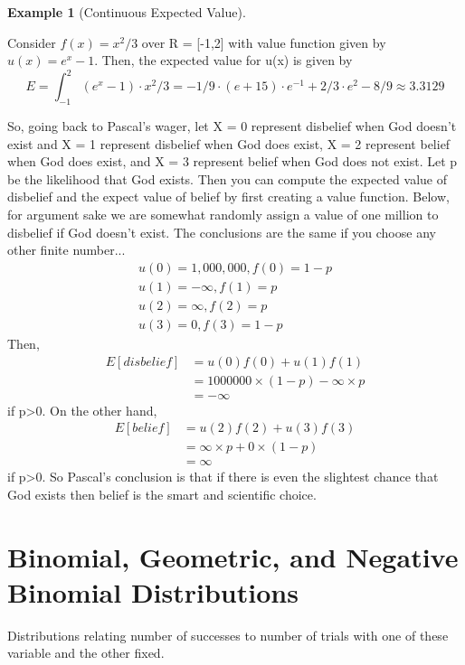 \documentclass[10pt,]{book}
\theoremstyle{plain}
\theoremstyle{definition}
\theoremstyle{definition}
\newtheorem{example}[theorem]{Example}
\numberwithin{equation}{section}
\begin{document}
\begin{example}[Continuous Expected Value]\label{example-22}

	Consider \(f(x) = x^2/3\) over R = [-1,2] with value function given by \(u(x) = e^x - 1\). Then, the expected value for u(x) is given by
	\begin{equation*}E = \int_{-1}^2 (e^x-1) \cdot x^2/3 = -1/9 \cdot (e + 15) \cdot e^{-1} + 2/3 \cdot e^2 - 8/9 \approx 3.3129\end{equation*}
\end{example}
\par
So, going back to Pascal's wager, let X = 0 represent disbelief when God doesn't exist and X = 1 represent disbelief when God does exist, X = 2 represent belief when God does exist, and X = 3 represent belief when God does not exist. Let p be the likelihood that God exists. Then you can compute the expected value of disbelief and the expect value of belief by first creating a value function. Below, for argument sake we are somewhat randomly assign a value of one million to disbelief if God doesn't exist. The conclusions are the same if you choose any other finite number...
	\begin{gather*}
u(0) = 1,000,000, f(0) = 1-p\\
u(1) = -\infty, f(1) = p\\
u(2) = \infty, f(2) = p\\
u(3) = 0, f(3) = 1-p
\end{gather*}
	Then, 
	\begin{align*}
E[disbelief] & = u(0)f(0) + u(1)f(1)\\
& = 1000000 \times (1-p) - \infty \times p\\
& = -\infty
\end{align*}
	if p>0. On the other hand, 
	\begin{align*}
E[belief] & = u(2)f(2) + u(3)f(3)\\
& = \infty \times p + 0 \times (1-p)\\
& = \infty
\end{align*}
	if p>0. So Pascal's conclusion is that if there is even the slightest chance that God exists then belief is the smart and scientific choice.
\typeout{************************************************}
\typeout{************************************************}
\chapter[Binomial, Geometric, and Negative Binomial Distributions]{Binomial, Geometric, and Negative Binomial Distributions}\label{BinomNegBinom}
\typeout{************************************************}
\typeout{************************************************}
Distributions relating number of successes to number of trials with one 
	of these variable and the other fixed.%
\typeout{************************************************}
\typeout{************************************************}
\end{document}
